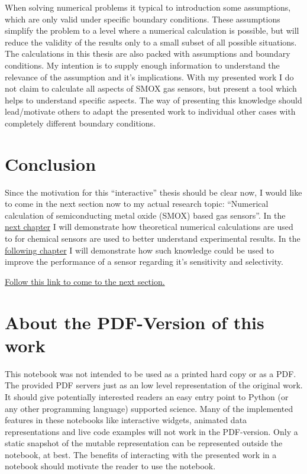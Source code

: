 \documentclass[11pt]{article}
\begin{document}
When solving numerical problems it typical to introduction some
assumptions, which are only valid under specific boundary conditions.
These assumptions simplify the problem to a level where a numerical
calculation is possible, but will reduce the validity of the results
only to a small subset of all possible situations. The calculations in
this thesis are also packed with assumptions and boundary conditions. My
intention is to supply enough information to understand the relevance of
the assumption and it's implications. With my presented work I do not
claim to calculate all aspects of SMOX gas sensors, but present a tool
which helps to understand specific aspects. The way of presenting this
knowledge should lead/motivate others to adapt the presented work to
individual other cases with completely different boundary conditions.

    \hypertarget{conclusion}{%
\section{Conclusion}\label{conclusion}}

Since the motivation for this ``interactive'' thesis should be clear
now, I would like to come in the next section now to my actual research
topic: ``Numerical calculation of semiconducting metal oxide (SMOX)
based gas sensors''. In the \href{2-Grain-SMOX.ipynb}{next chapter} I
will demonstrate how theoretical numerical calculations are used to for
chemical sensors are used to better understand experimental results. In
the \href{3-Applying_theorie-to-practice.ipynb}{following chapter} I
will demonstrate how such knowledge could be used to improve the
performance of a sensor regarding it's sensitivity and selectivity.

\href{2-Grain-SMOX.ipynb}{Follow this link to come to the next section.}

    \hypertarget{about-the-pdf-version-of-this-work}{%
\section{About the PDF-Version of this
work}\label{about-the-pdf-version-of-this-work}}

This notebook was not intended to be used as a printed hard copy or as a
PDF. The provided PDF servers just as an low level representation of the
original work. It should give potentially interested readers an easy
entry point to Python (or any other programming language) supported
science. Many of the implemented features in these notebooks like
interactive widgets, animated data representations and live code
examples will not work in the PDF-version. Only a static snapshot of the
mutable representation can be represented outside the notebook, at best.
The benefits of interacting with the presented work in a notebook should
motivate the reader to use the notebook.
\end{document}

